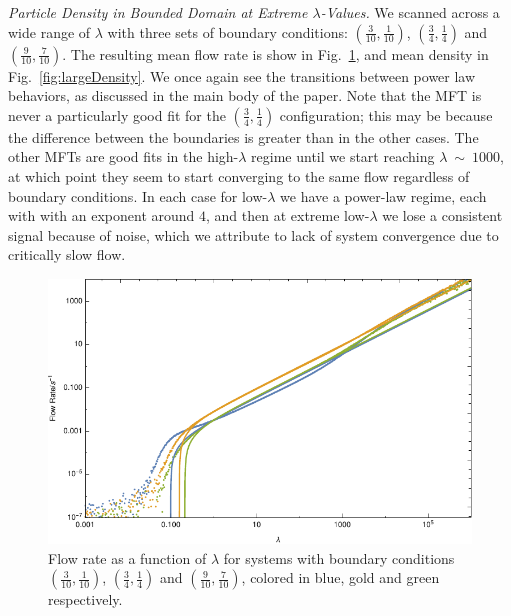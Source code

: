 \documentclass[
reprint,
 amsmath,amssymb,
 aps,
 prl,
]{revtex4-1}
\begin{document}
\textit{Particle Density in Bounded Domain at Extreme $\lambda$-Values.}
We scanned across a wide range of $\lambda$ with three sets of boundary conditions: $(\frac{3}{10}, \frac{1}{10})$, $(\frac{3}{4}, \frac{1}{4})$ and $(\frac{9}{10}, \frac{7}{10})$. The resulting mean flow rate is show in
Fig.~\ref{fig:largeFlow}, and mean density in Fig.~\ref{fig:largeDensity}. We once again see the transitions between power law behaviors, as discussed in the main body of the paper. Note that the MFT is never a particularly good
fit for the $(\frac{3}{4}, \frac{1}{4})$ configuration; this may be because the difference between the boundaries is greater than in the other cases. The other MFTs are good fits in the high-$\lambda$ regime until we start reaching $\lambda~\sim~1000$,
at which point they seem to start converging to the same flow regardless of boundary conditions. In each case for low-$\lambda$ we have a power-law regime, each with with an exponent around $4$, and then at extreme low-$\lambda$ we lose
a consistent signal because of noise, which we attribute to lack of system convergence due to critically slow flow.
\begin{figure}[h!]
\vspace{1em}
\caption{\label{fig:largeFlow} Flow rate as a function of $\lambda$ for systems with boundary conditions $(\frac{3}{10}, \frac{1}{10})$, $(\frac{3}{4}, \frac{1}{4})$ and $(\frac{9}{10}, \frac{7}{10})$, colored in blue, gold and green
respectively.}
    \includegraphics[width=0.95\linewidth]{images/largeRangeFlow}
    \vspace{0em}
\end{figure}
\end{document}
